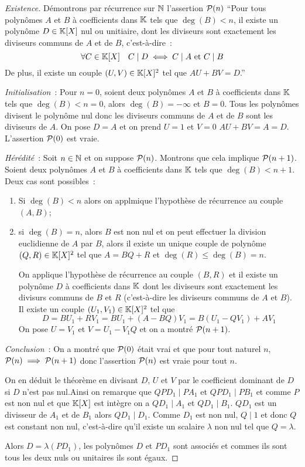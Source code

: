 \begin{proof}[Existence]
  Démontrons par récurrence sur $\N$ l'assertion $\P(n)$ ``Pour tous polynômes $A$ et $B$ à coefficients dans $\K$ tels que $\deg(B)<n$, il existe un polynôme $D \in \K[X]$  nul ou unitiaire, dont les diviseurs sont exactement les diviseurs communs de $A$ et de $B$, c'est-à-dire~:
  \begin{equation}
    \forall C \in \K[X] \quad C\mid{}D \iff C\mid{}A \text{~et~} C\mid{}B
  \end{equation}
  De plus, il existe un couple $(U,V) \in \K[X]^2$ tel que $AU+BV=D$.''

  \emph{Initialisation}~: Pour $n=0$, soient deux polynômes $A$ et $B$ à coefficients dans $\K$ tels que $\deg(B)<n=0$, alors $\deg(B)=-\infty$ et $B=0$. Tous les polynômes divisent le polynôme nul donc les diviseurs communs de $A$ et de $B$ sont les diviseurs de $A$. On pose $D=A$ et on prend $U=1$ et $V=0$ $AU+BV=A=D$. L'assertion $\P(0)$ est vraie.

  \emph{Hérédité}~: Soit $n \in \N$ et on suppose $\P(n)$. Montrons que cela implique $\P(n+1)$. Soient deux polynômes $A$ et $B$ à coefficients dans $\K$ tels que $\deg(B)<n+1$. Deux cas sont possibles~:
  \begin{enumerate}
  \item Si $\deg(B)<n$ alors on applmique l'hypothèse de récurrence au couple $(A,B)$;
  \item si $\deg(B)=n$, alors $B$ est non nul et on peut effectuer la division euclidienne de $A$ par $B$, alors il existe un unique couple de polynôme $(Q,R) \in \K[X]^2$ tel que $A=BQ+R$ et $\deg(R)\leqslant\deg(B)=n$.

    On applique l'hypothèse de récurrence au couple $(B,R)$ et il existe un polynôme $D$ à coefficients dans $\K$ dont les diviseurs sont exactement les divisurs communs de $B$ et $R$ (c'est-à-dire les diviseurs communs de $A$ et $B$). Il existe un couple $(U_1,V_1) \in \K[X]^2$ tel que
    \begin{equation}
      D=BU_1+RV_1=BU_1+(A-BQ)V_1=B(U_1-QV_1)+AV_1
    \end{equation}
    On pose $U=V_1$ et $V=U_1-V_1Q$ et on a montré $\P(n+1)$.
  \end{enumerate}
  
  \emph{Conclusion}~: On a montré que $\P(0)$ était vrai et que pour tout naturel $n$, $\P(n)\implies\P(n+1)$ donc l'assertion $\P(n)$ est vraie pour tout $n$.
  
  On en déduit le théorème en divisant $D$, $U$ et $V$ par le coefficient dominant de $D$ si $D$ n'est pas nul.Ainsi on remarque que  $QPD_1 \mid{}PA_1$ et $QPD_1\mid{}PB_1$ et comme $P$ est non nul et que $\K[X]$ est intègre on a $QD_1 \mid{}A_1$ et $QD_1\mid{}B_1$. $QD_1$ est un divisseur de $A_1$ et de $B_1$ alors $QD_1\mid{}D_1$. Comme $D_1$ est non nul, $Q\mid{}1$ et donc $Q$ est constant non nul, c'est-à-dire qu'il existe un scalaire $\lambda$ non nul tel que $Q=\lambda$. 

  Alors $D=\lambda(PD_1)$, les polynômes $D$ et $PD_1$ sont associés et commes ils sont tous les deux nuls ou unitaires ils sont égaux.
\end{proof}

